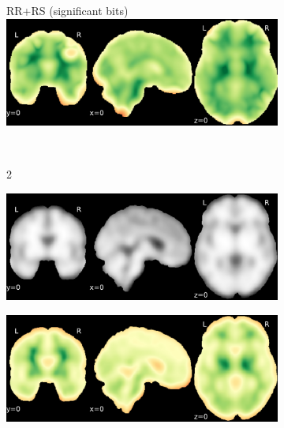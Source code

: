 \documentclass{article}
\begin{document}
\begin{appendices}
\begin{landscape}
\begin{figure}
\begin{subfigure}[t]{0.2\paperheight}
            \end{subfigure}
            \begin{subfigure}[t]{0.2\paperheight}
                \centering
                RR+RS (significant bits)
                \includegraphics[width=\textwidth]{figures/sig/15mm/rs_ds001600_sub-1_sig.pdf}
            \end{subfigure} \\
            \begin{subfigure}[b][][c]{0.01\paperwidth} 2 \vspace*{15pt} \end{subfigure}
            \begin{subfigure}[t]{0.2\paperheight}
                \centering
                \includegraphics[width=\textwidth]{figures/sig/15mm/ieee_ds001771_sub-36.pdf}
            \end{subfigure}
            \begin{subfigure}[t]{0.2\paperheight}
                \centering
                \includegraphics[width=\textwidth]{figures/sig/15mm/rr_ds001771_sub-36_sig.pdf}

\end{subfigure}
\end{figure}
\end{landscape}
\end{appendices}
\end{document}
